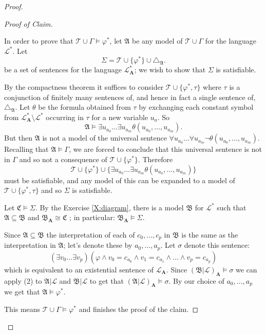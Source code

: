 \documentclass[titlepage, oneside]{amsbook}
\theoremstyle{plain}
\theoremstyle{definition}
\theoremstyle{remark}
\newcommand{\theory}{\ensuremath{\mathcal{T}}}
\newcommand{\lan}{\ensuremath{\mathcal{L}}}
\newcommand{\seq}{\ensuremath{\subseteq}}
\newcommand{\ma}{\ensuremath{\mathfrak{A}}}
\newcommand{\mb}{\ensuremath{\mathfrak{B}}}
\newcommand{\mc}{\ensuremath{\mathfrak{C}}}
\newcommand{\ba}{\ensuremath{\mathbf{A}}}
\newcommand{\fru}[2][0]{\ensuremath{\forall u_{#1}  \dots  \forall
u_{#2}}}
\newcommand{\exu}[2][0]{\ensuremath{\exists u_{#1}  \dots  \exists   
u_{#2}}}
\newcommand{\exv}[2][0]{\ensuremath{\exists v_{#1}  \dots  \exists
v_{#2}}}
\newcommand{\unot}[2][0]{\ensuremath{ u_{#1} , \dots , u_{#2}}}
\begin{document}
\begin{proof}
\begin{proof}[Proof of Claim]
$  $ \par

In order to prove that $\theory \cup \Gamma \models \varphi^{\ast}$, let
$\ma$
be any model of $\theory \cup \Gamma$ for the language $\lan^{\ast}$. Let 
\[
\Sigma = \theory \cup \{ \varphi^{\ast} \} \cup \triangle _{\ma}.
\]  
be a set of sentences for the language $\lan ^{\ast}_{\ba}$; we wish to show that
$\Sigma$ is satisfiable.  

By the compactness theorem it suffices to consider
$\theory \cup \{ \varphi^{\ast} , \tau \}$ where $\tau$ is a conjunction of
finitely many sentences of, and hence in fact a single sentence of, 
$\triangle _{\ma}$.  
Let $\theta$ be the formula obtained from $\tau$ by exchanging each constant symbol from $\lan ^{\ast} _\ba \setminus \lan ^{\ast} $ occurring in $\tau$ for a new variable $u_a$. So 
\[ 
\ma \models \exu[a_0]{a_m} \theta ( \unot[a_0]{a_m} ). 
\]
But then $\ma$ is not a model of the universal sentence
$\fru[a_0]{a_m} \neg \theta ( \unot[a_0]{a_m})$. Recalling that $\ma
\models \Gamma$, we are forced to conclude that this universal sentence
is not in
$\Gamma$ and so not a consequence of $\theory \cup \{ \varphi^{\ast} \}$.
Therefore 
\[ 
\theory \cup \{ \varphi^{\ast} \} \cup \{ \exu[a_0]{a_m} \theta (
\unot[a_0]{a_m} ) \} 
\] 
must be satisfiable, and any model of this can
be expanded to a model of $\theory \cup \{ \varphi^{\ast} , \tau \}$ and so 
$\Sigma$ is satisfiable.

Let $\mc \models \Sigma$.  By the Exercise \ref{X:diagram}, there is a model $\mb$ for $\lan ^{\ast}$ such that $\ma \seq \mb$ and $\mb_\ba \cong \mc$ ; in particular: $\mb_\ba \models \Sigma$.

Since $\ma \seq \mb$ the interpretation of each of $c_{0},\dots,c_{p}$ in $\mb$ is the same as the interpretation in $\ma$; let's denote these by $a_{0},\dots,a_{p}$. Let $\sigma$ denote this sentence:
\[
   ( \exv[0]{p} )(\varphi \wedge v_{0} = c_{a_{0}} \wedge v_{1} = c_{a_{1}}
\wedge \dots \wedge v_{p} = c_{a_{p}})
\] 
which is equivalent to an existential sentence of $\lan_{\ba}$. 
Since $(\mb|\lan)_{\ba} \models \sigma$ we can apply (2) to $\ma |\lan$ and $\mb |\lan$ to get that $(\ma |\lan)_{\ba} \models \sigma$. 
By our choice of $a_{0},\dots,a_{p}$ we get that $\ma \models \varphi ^{\ast}$.

This means $\theory \cup \Gamma \models \varphi^{\ast}$ and finishes the proof of
the claim.

\renewcommand{\qedsymbol}{}
\end{proof}


\end{proof}
\end{document}
